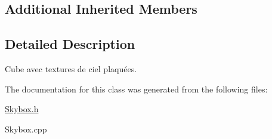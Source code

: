 \subsection*{Additional Inherited Members}


\subsection{Detailed Description}
Cube avec textures de ciel plaquées. 

The documentation for this class was generated from the following files\-:\begin{DoxyCompactItemize}
\item 
\hyperlink{Skybox_8h}{Skybox.\-h}\item 
Skybox.\-cpp\end{DoxyCompactItemize}
